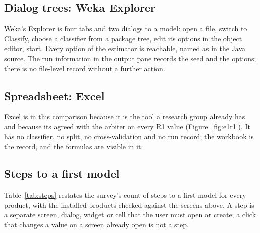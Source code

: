 \subsection{Dialog trees: Weka Explorer}



Weka's Explorer is four tabs and two dialogs to a model: open a file, switch to Classify, choose a classifier from a package tree, edit its options in the object editor, start. Every option of the estimator is reachable, named as in the Java source. The run information in the output pane records the seed and the options; there is no file-level record without a further action.

\subsection{Spreadsheet: Excel}


Excel is in this comparison because it is the tool a research group already has and because its  agreed with the arbiter on every R1 value (Figure~\ref{fig:e1r1}). It has no classifier, no split, no cross-validation and no run record; the workbook is the record, and the formulas are visible in it.

\subsection{Steps to a first model}

Table~\ref{tab:steps} restates the survey's count of steps to a first model for every product, with the installed products checked against the screens above. A step is a separate screen, dialog, widget or cell that the user must open or create; a click that changes a value on a screen already open is not a step.

